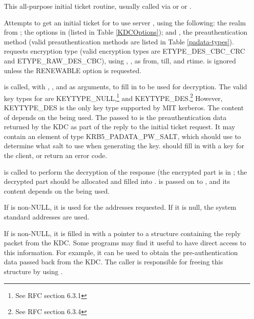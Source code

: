 This all-purpose initial ticket routine, usually called via
 or
 or
.


Attempts to get an initial ticket for 
to use server , using the following:
the realm from ; the options in
 (listed in Table \ref{KDCOptions});
and , the preauthentication
method (valid preauthentication methods are listed in Table
\ref{padata-types}).
 requests encryption type
 (valid encryption types are ETYPE_DES_CBC_CRC and
ETYPE_RAW_DES_CBC),
using ,
,
as from, till, and rtime.   is
ignored unless the RENEWABLE option is requested.

 is called, with , ,
 and as arguments, to fill in  to be used for
decryption.  The valid key types for  are
KEYTYPE_NULL,\footnote{See RFC section 6.3.1} and
KEYTYPE_DES.\footnote{See RFC section 6.3.4}  However, KEYTYPE_DES is
the only key type supported by MIT kerberos.
The content of   
depends on the  being used. %
The  passed
to  is the preauthentication data returned by the
KDC as part of the reply to the initial ticket request.  It may
contain an element of type KRB5_PADATA_PW_SALT, which
 should use to determine what salt to use when
generating the key.   should fill in
 with a key for the client, or return an error code.

 is called to perform the decryption of the
response (the encrypted part is in
; the decrypted part should be
allocated and filled into
.
 is passed on to , and
its content depends on the  being used.

If  is non-NULL, it is used for the addresses
requested.  If it is null, the system standard addresses are used.

If  is non-NULL, it is filled in with a
pointer to a structure containing the reply packet from the KDC.  Some
programs may find it useful to have direct access to this information.
For example, it can be used to obtain the pre-authentication data
passed back from the KDC.  The caller is responsible for freeing this
structure by using .


